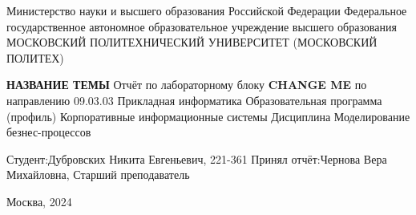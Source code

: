 \singlespacing

\newpage
\begin{center}
    Министерство науки и высшего образования Российской Федерации
    \bigbreak
    Федеральное государственное автономное образовательное учреждение
    высшего образования
    \bigbreak
    \guillemotleft МОСКОВСКИЙ ПОЛИТЕХНИЧЕСКИЙ УНИВЕРСИТЕТ\guillemotright
    \bigbreak
    (МОСКОВСКИЙ ПОЛИТЕХ)
\end{center}
\hfill
\bigbreak
\bigbreak
\bigbreak
\begin{center}
    \textbf{\guillemotleft НАЗВАНИЕ ТЕМЫ\guillemotright}
    \bigbreak
    \bigbreak
    \bigbreak
    \bigbreak
    Отчёт по лабораторному блоку \textbf{CHANGE ME}
    \bigbreak
    по направлению 09.03.03 Прикладная информатика
    \bigbreak
    Образовательная программа (профиль)
    \bigbreak
    \guillemotleft Корпоративные информационные системы\guillemotright
    \bigbreak
    Дисциплина
    \bigbreak
    \guillemotleft Моделирование безнес-процессов\guillemotright
    \bigbreak
    \bigbreak
    \bigbreak
    \bigbreak
\end{center}
\vfill
Студент:\hfill Дубровских Никита Евгеньевич, 221-361
\bigbreak
\bigbreak
\bigbreak
\noindent
Принял отчёт:\hfill Чернова Вера Михайловна, Старший преподаватель
\bigbreak
\bigbreak
\bigbreak
\begin{center}
    Москва, 2024
\end{center}
\newpage
\onehalfspacing
